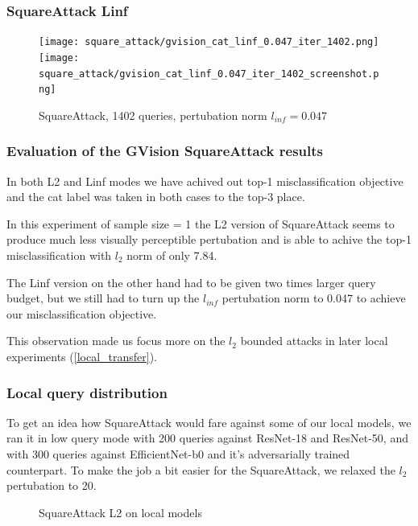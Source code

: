 \subsubsection{SquareAttack Linf}

\begin{figure}[!htb]
\null\hspace{1cm}
  \texttt{[image: square\_attack/gvision\_cat\_linf\_0.047\_iter\_1402.png]}
\endminipage
\null\hspace{1cm}
  \texttt{[image: square\_attack/gvision\_cat\_linf\_0.047\_iter\_1402\_screenshot.png]}
\endminipage
\caption{SquareAttack, 1402 queries, pertubation norm $l_{inf} = 0.047$}
\label{fig:square_cat_linf}
\end{figure}

\subsubsection{Evaluation of the GVision SquareAttack results}

In both L2 and Linf modes we have achived out top-1 misclassification objective and the cat label was taken in both cases to the top-3 place.

In this experiment of sample size = 1 the L2 version of SquareAttack seems to produce much less visually perceptible pertubation and is able to achive the top-1 misclassification with $l_2$ norm of only 7.84.

The Linf version on the other hand had to be given two times larger query budget, but we still had to turn up the $l_{inf}$ pertubation norm to 0.047 to achieve our misclassification objective.


This observation made us focus more on the $l_2$ bounded attacks in later local experiments (\ref{local_transfer}).

\subsubsection{Local query distribution}
To get an idea how SquareAttack would fare against some of our local models, we ran it in low query mode with 200 queries against ResNet-18 and ResNet-50, and with 300 queries against EfficientNet-b0 and it's adversarially trained counterpart. To make the job a bit easier for the SquareAttack, we relaxed the $l_2$ pertubation to 20.

\begin{figure}[!htb]
 \hfill
 \hfill
\caption{SquareAttack L2 on local models}
\end{figure}

